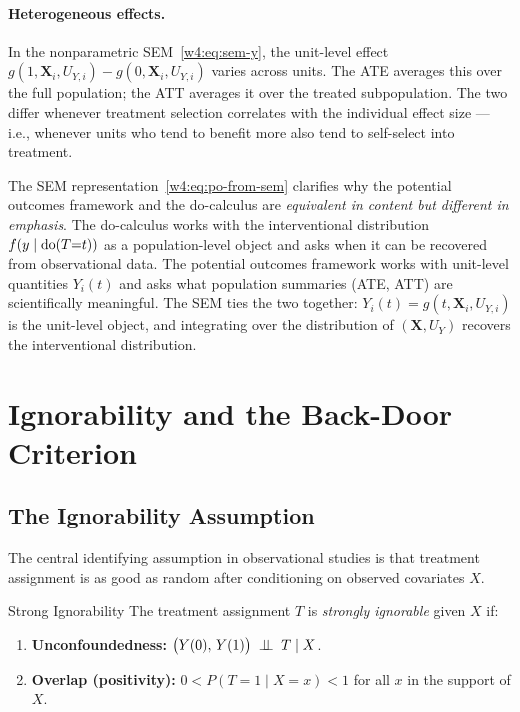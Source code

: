 \documentclass[master.tex]{subfiles}
\begin{document}
\paragraph{Heterogeneous effects.}
In the nonparametric SEM~\eqref{w4:eq:sem-y}, the unit-level effect
$g(1, \mathbf{X}_i, U_{Y,i}) - g(0, \mathbf{X}_i, U_{Y,i})$ varies
across units.  The ATE averages this over the full population; the ATT
averages it over the treated subpopulation.  The two differ whenever
treatment selection correlates with the individual effect size ---
i.e., whenever units who tend to benefit more also tend to self-select
into treatment.

\begin{remark}
The SEM representation~\eqref{w4:eq:po-from-sem} clarifies why the
potential outcomes framework and the do-calculus are \emph{equivalent in
content but different in emphasis}.  The do-calculus works with the
interventional distribution $f(y \mid \mathrm{do}(T{=}t))$ as a population-level
object and asks when it can be recovered from observational data.  The
potential outcomes framework works with unit-level quantities $Y_i(t)$ and
asks what population summaries (ATE, ATT) are scientifically meaningful.
The SEM ties the two together: $Y_i(t) = g(t, \mathbf{X}_i, U_{Y,i})$
is the unit-level object, and integrating over the distribution of
$(\mathbf{X}, U_Y)$ recovers the interventional distribution.
\end{remark}

\section{Ignorability and the Back-Door Criterion}
\label{w4:sec:ignorability}

\subsection{The Ignorability Assumption}

The central identifying assumption in observational studies is that
treatment assignment is as good as random after conditioning on observed
covariates $X$.

\begin{defn}{Strong Ignorability \citep{rosenbaum1983central}}
\label{w4:defn:ignorability}
The treatment assignment $T$ is \emph{strongly ignorable} given $X$ if:
\begin{enumerate}
  \item \textbf{Unconfoundedness:}
        $\bigl(Y(0),\, Y(1)\bigr) \;\perp\!\!\!\perp\; T \mid X$.
  \item \textbf{Overlap (positivity):}
        $0 < P(T{=}1 \mid X{=}x) < 1$ for all $x$ in the support of $X$.
\end{enumerate}
\end{defn}
\end{document}
